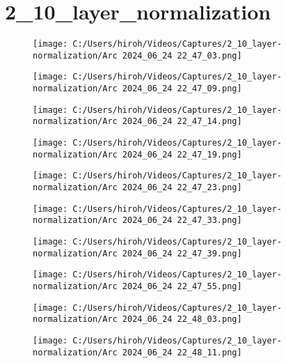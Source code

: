 \documentclass{ltjsarticle}
\begin{document}
\clearpage
\section{2\_10\_layer\_normalization}
\begin{figure}[htbp]
  \centering
  \texttt{[image: C:/Users/hiroh/Videos/Captures/2\_10\_layer-normalization/Arc 2024\_06\_24 22\_47\_03.png]}
\end{figure}
\begin{figure}[htbp]
  \centering
  \texttt{[image: C:/Users/hiroh/Videos/Captures/2\_10\_layer-normalization/Arc 2024\_06\_24 22\_47\_09.png]}
\end{figure}
\begin{figure}[htbp]
  \centering
  \texttt{[image: C:/Users/hiroh/Videos/Captures/2\_10\_layer-normalization/Arc 2024\_06\_24 22\_47\_14.png]}
\end{figure}
\begin{figure}[htbp]
  \centering
  \texttt{[image: C:/Users/hiroh/Videos/Captures/2\_10\_layer-normalization/Arc 2024\_06\_24 22\_47\_19.png]}
\end{figure}
\begin{figure}[htbp]
  \centering
  \texttt{[image: C:/Users/hiroh/Videos/Captures/2\_10\_layer-normalization/Arc 2024\_06\_24 22\_47\_23.png]}
\end{figure}
\begin{figure}[htbp]
  \centering
  \texttt{[image: C:/Users/hiroh/Videos/Captures/2\_10\_layer-normalization/Arc 2024\_06\_24 22\_47\_33.png]}
\end{figure}
\begin{figure}[htbp]
  \centering
  \texttt{[image: C:/Users/hiroh/Videos/Captures/2\_10\_layer-normalization/Arc 2024\_06\_24 22\_47\_39.png]}
\end{figure}
\begin{figure}[htbp]
  \centering
  \texttt{[image: C:/Users/hiroh/Videos/Captures/2\_10\_layer-normalization/Arc 2024\_06\_24 22\_47\_55.png]}
\end{figure}
\begin{figure}[htbp]
  \centering
  \texttt{[image: C:/Users/hiroh/Videos/Captures/2\_10\_layer-normalization/Arc 2024\_06\_24 22\_48\_03.png]}
\end{figure}
\begin{figure}[htbp]
  \centering
  \texttt{[image: C:/Users/hiroh/Videos/Captures/2\_10\_layer-normalization/Arc 2024\_06\_24 22\_48\_11.png]}
\end{figure}
\end{document}
